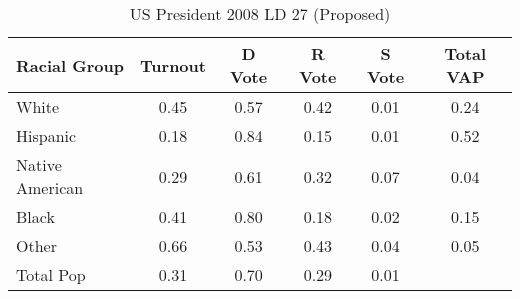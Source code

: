 \begin{table}[htb]
\begin{center}
\caption{US President 2008 LD 27 (Proposed)}
\label{pres08_vap_ld_27}
\begin{tabular}{lccccc}
  \hline
Racial Group & Turnout & D Vote & R Vote & S Vote & Total VAP \\ 
  \hline
White & 0.45 & 0.57 & 0.42 & 0.01 & 0.24 \\ 
  Hispanic & 0.18 & 0.84 & 0.15 & 0.01 & 0.52 \\ 
  Native American & 0.29 & 0.61 & 0.32 & 0.07 & 0.04 \\ 
  Black & 0.41 & 0.80 & 0.18 & 0.02 & 0.15 \\ 
  Other & 0.66 & 0.53 & 0.43 & 0.04 & 0.05 \\ 
  Total Pop & 0.31 & 0.70 & 0.29 & 0.01 &  \\ 
   \hline
\end{tabular}
\end{center}
\end{table}
